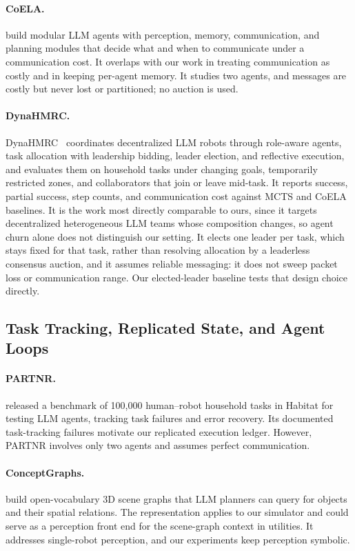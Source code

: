 \documentclass[letterpaper]{article}
\begin{document}
\paragraph{CoELA.}
\citet{zhang2024coela} build modular LLM agents with perception, memory, communication, and planning modules that decide what and when to communicate under a communication cost. It overlaps with our work in treating communication as costly and in keeping per-agent memory. It studies two agents, and messages are costly but never lost or partitioned; no auction is used.

\paragraph{DynaHMRC.}
DynaHMRC~\citep{dynahmrc2026} coordinates decentralized LLM robots through role-aware agents, task allocation with leadership bidding, leader election, and reflective execution, and evaluates them on household tasks under changing goals, temporarily restricted zones, and collaborators that join or leave mid-task. It reports success, partial success, step counts, and communication cost against MCTS and CoELA baselines. It is the work most directly comparable to ours, since it targets decentralized heterogeneous LLM teams whose composition changes, so agent churn alone does not distinguish our setting. It elects one leader per task, which stays fixed for that task, rather than resolving allocation by a leaderless consensus auction, and it assumes reliable messaging: it does not sweep packet loss or communication range. Our elected-leader baseline tests that design choice directly.

\subsection{Task Tracking, Replicated State, and Agent Loops}

\paragraph{PARTNR.}
\citet{chang2025partnr} released a benchmark of 100,000 human--robot household tasks in Habitat for testing LLM agents, tracking task failures and error recovery. Its documented task-tracking failures motivate our replicated execution ledger. However, PARTNR involves only two agents and assumes perfect communication.

\paragraph{ConceptGraphs.}
\citet{gu2024conceptgraphs} build open-vocabulary 3D scene graphs that LLM planners can query for objects and their spatial relations. The representation applies to our simulator and could serve as a perception front end for the scene-graph context in utilities. It addresses single-robot perception, and our experiments keep perception symbolic.
\end{document}
